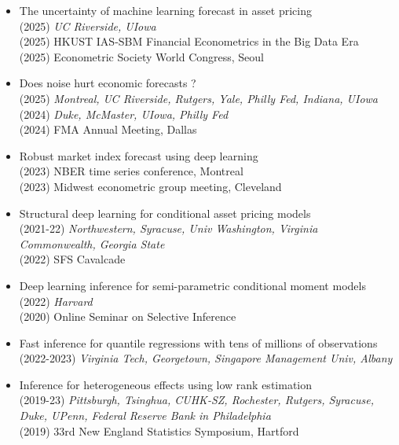 \documentclass[11pt]{article}
\begin{document}
\begin{itemize}
	
	\item The uncertainty of machine learning forecast in asset pricing
	\hfill\\ 
	(2025) \textit{UC Riverside, UIowa}\\
	(2025)  HKUST IAS-SBM Financial Econometrics in the Big Data Era \\
	(2025) Econometric Society World Congress, Seoul 

\item Does noise hurt economic forecasts ? 
\hfill\\
(2025) \textit{Montreal, UC Riverside, Rutgers, Yale, Philly Fed, Indiana, UIowa}  
\hfill\\
(2024) \textit{Duke, McMaster,  UIowa, Philly Fed}  \\
(2024) FMA Annual Meeting, Dallas 

\item Robust market index forecast using deep learning
\hfill\\
(2023) NBER time series conference, Montreal\\
(2023) Midwest econometric group meeting, Cleveland 



\item Structural deep learning  for  conditional asset pricing models
\hfill\\
(2021-22) \textit{Northwestern, Syracuse, Univ Washington, Virginia Commonwealth, Georgia State}
\\
 (2022) SFS Cavalcade

\item Deep learning inference for semi-parametric conditional moment models
\hfill\\
(2022) \textit{Harvard } \\
(2020) Online Seminar on Selective Inference

  
  \item Fast inference for quantile regressions with tens of millions of observations
  \hfill\\
  (2022-2023) \textit{Virginia Tech, Georgetown, Singapore Management Univ, Albany}  
  
  
 
 
\item Inference for heterogeneous effects using low rank estimation
\hfill\\
(2019-23) \textit{Pittsburgh, Tsinghua, CUHK-SZ, Rochester,  Rutgers, Syracuse, Duke, UPenn, Federal Reserve Bank in Philadelphia}\\
(2019)  33rd New England Statistics Symposium,  Hartford


\end{itemize}
\end{document}
